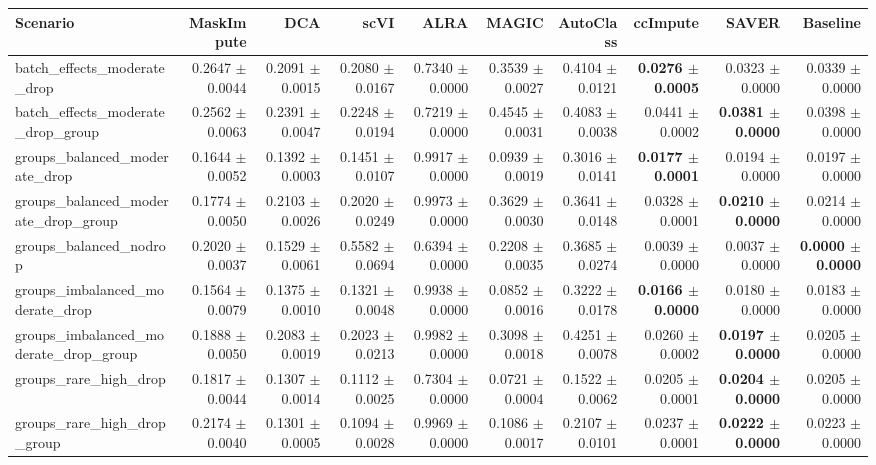 \begin{tabular}{@{}lrrrrrrrrr@{}}
\toprule
Scenario & MaskImpute & DCA & scVI & ALRA & MAGIC & AutoClass & ccImpute & SAVER & Baseline \\
\midrule
batch\_effects\_moderate\_drop & 0.2647 $\pm$ 0.0044 & 0.2091 $\pm$ 0.0015 & 0.2080 $\pm$ 0.0167 & 0.7340 $\pm$ 0.0000 & 0.3539 $\pm$ 0.0027 & 0.4104 $\pm$ 0.0121 & \textbf{0.0276 $\pm$ 0.0005} & 0.0323 $\pm$ 0.0000 & 0.0339 $\pm$ 0.0000 \\
batch\_effects\_moderate\_drop\_group & 0.2562 $\pm$ 0.0063 & 0.2391 $\pm$ 0.0047 & 0.2248 $\pm$ 0.0194 & 0.7219 $\pm$ 0.0000 & 0.4545 $\pm$ 0.0031 & 0.4083 $\pm$ 0.0038 & 0.0441 $\pm$ 0.0002 & \textbf{0.0381 $\pm$ 0.0000} & 0.0398 $\pm$ 0.0000 \\
groups\_balanced\_moderate\_drop & 0.1644 $\pm$ 0.0052 & 0.1392 $\pm$ 0.0003 & 0.1451 $\pm$ 0.0107 & 0.9917 $\pm$ 0.0000 & 0.0939 $\pm$ 0.0019 & 0.3016 $\pm$ 0.0141 & \textbf{0.0177 $\pm$ 0.0001} & 0.0194 $\pm$ 0.0000 & 0.0197 $\pm$ 0.0000 \\
groups\_balanced\_moderate\_drop\_group & 0.1774 $\pm$ 0.0050 & 0.2103 $\pm$ 0.0026 & 0.2020 $\pm$ 0.0249 & 0.9973 $\pm$ 0.0000 & 0.3629 $\pm$ 0.0030 & 0.3641 $\pm$ 0.0148 & 0.0328 $\pm$ 0.0001 & \textbf{0.0210 $\pm$ 0.0000} & 0.0214 $\pm$ 0.0000 \\
groups\_balanced\_nodrop & 0.2020 $\pm$ 0.0037 & 0.1529 $\pm$ 0.0061 & 0.5582 $\pm$ 0.0694 & 0.6394 $\pm$ 0.0000 & 0.2208 $\pm$ 0.0035 & 0.3685 $\pm$ 0.0274 & 0.0039 $\pm$ 0.0000 & 0.0037 $\pm$ 0.0000 & \textbf{0.0000 $\pm$ 0.0000} \\
groups\_imbalanced\_moderate\_drop & 0.1564 $\pm$ 0.0079 & 0.1375 $\pm$ 0.0010 & 0.1321 $\pm$ 0.0048 & 0.9938 $\pm$ 0.0000 & 0.0852 $\pm$ 0.0016 & 0.3222 $\pm$ 0.0178 & \textbf{0.0166 $\pm$ 0.0000} & 0.0180 $\pm$ 0.0000 & 0.0183 $\pm$ 0.0000 \\
groups\_imbalanced\_moderate\_drop\_group & 0.1888 $\pm$ 0.0050 & 0.2083 $\pm$ 0.0019 & 0.2023 $\pm$ 0.0213 & 0.9982 $\pm$ 0.0000 & 0.3098 $\pm$ 0.0018 & 0.4251 $\pm$ 0.0078 & 0.0260 $\pm$ 0.0002 & \textbf{0.0197 $\pm$ 0.0000} & 0.0205 $\pm$ 0.0000 \\
groups\_rare\_high\_drop & 0.1817 $\pm$ 0.0044 & 0.1307 $\pm$ 0.0014 & 0.1112 $\pm$ 0.0025 & 0.7304 $\pm$ 0.0000 & 0.0721 $\pm$ 0.0004 & 0.1522 $\pm$ 0.0062 & 0.0205 $\pm$ 0.0001 & \textbf{0.0204 $\pm$ 0.0000} & 0.0205 $\pm$ 0.0000 \\
groups\_rare\_high\_drop\_group & 0.2174 $\pm$ 0.0040 & 0.1301 $\pm$ 0.0005 & 0.1094 $\pm$ 0.0028 & 0.9969 $\pm$ 0.0000 & 0.1086 $\pm$ 0.0017 & 0.2107 $\pm$ 0.0101 & 0.0237 $\pm$ 0.0001 & \textbf{0.0222 $\pm$ 0.0000} & 0.0223 $\pm$ 0.0000 \\

\end{tabular}
